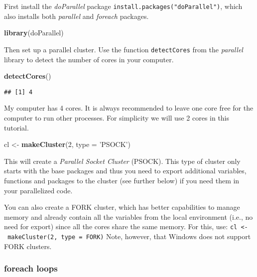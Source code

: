 \documentclass[]{article}
\newenvironment{Shaded}{\begin{snugshade}}{\end{snugshade}}
\newcommand{\KeywordTok}[1]{\textcolor[rgb]{0.13,0.29,0.53}{\textbf{#1}}}
\newcommand{\DataTypeTok}[1]{\textcolor[rgb]{0.13,0.29,0.53}{#1}}
\newcommand{\DecValTok}[1]{\textcolor[rgb]{0.00,0.00,0.81}{#1}}
\newcommand{\StringTok}[1]{\textcolor[rgb]{0.31,0.60,0.02}{#1}}
\newcommand{\NormalTok}[1]{#1}
\begin{document}
First install the \emph{doParallel} package
\texttt{install.packages("doParallel")}, which also installs both
\emph{parallel} and \emph{foreach} packages.

\begin{Shaded}
\begin{Highlighting}[]
\KeywordTok{library}\NormalTok{(doParallel)}
\end{Highlighting}
\end{Shaded}

Then set up a parallel cluster. Use the function \texttt{detectCores}
from the \emph{parallel} library to detect the number of cores in your
computer.

\begin{Shaded}
\begin{Highlighting}[]
\KeywordTok{detectCores}\NormalTok{()}
\end{Highlighting}
\end{Shaded}

\begin{verbatim}
## [1] 4
\end{verbatim}

My computer has 4 cores. It is always recommended to leave one core free
for the computer to run other processes. For simplicity we will use 2
cores in this tutorial.

\begin{Shaded}
\begin{Highlighting}[]
\NormalTok{cl <-}\StringTok{ }\KeywordTok{makeCluster}\NormalTok{(}\DecValTok{2}\NormalTok{, }\DataTypeTok{type =} \StringTok{'PSOCK'}\NormalTok{)}
\end{Highlighting}
\end{Shaded}

This will create a \emph{Parallel Socket Cluster} (PSOCK). This type of
cluster only starts with the base packages and thus you need to export
additional variables, functions and packages to the cluster (see further
below) if you need them in your parallelized code.

You can also create a FORK cluster, which has better capabilities to
manage memory and already contain all the variables from the local
environment (i.e., no need for export) since all the cores share the
same memory. For this, use:
\texttt{cl\ \textless{}-\ makeCluster(2,\ type\ =\ \textquotesingle{}FORK\textquotesingle{})}
Note, however, that Windows does not support FORK clusters.

\subsubsection{foreach loops}\label{foreach-loops}
\end{document}
